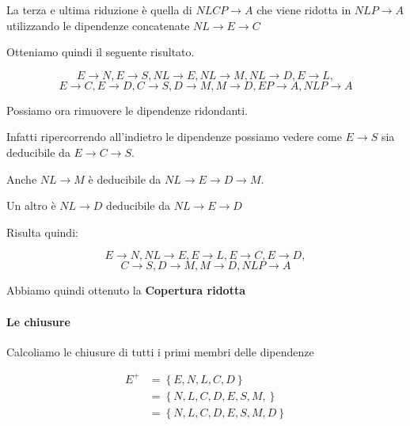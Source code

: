 \begin{exmp}
    La terza e ultima riduzione è quella di $ NLCP \rightarrow A$ che viene ridotta in $NLP \rightarrow A $ utilizzando le dipendenze concatenate $NL \rightarrow E \rightarrow C$ 

    Otteniamo quindi il seguente risultato.

    \[
    E \rightarrow N,
    E \rightarrow S,
    NL \rightarrow E,
    NL \rightarrow M,
    NL \rightarrow D,
    E \rightarrow L,
    \]
    \[
    E \rightarrow C,
    E \rightarrow D,
    C \rightarrow S,
    D \rightarrow M,
    M \rightarrow D,
    EP \rightarrow A,
    NLP \rightarrow A
    \]

    Possiamo ora rimuovere le dipendenze ridondanti.

    Infatti ripercorrendo all'indietro le dipendenze possiamo vedere come $E \rightarrow S$ sia deducibile da $E \rightarrow C  \rightarrow S$.

    Anche $NL \rightarrow M$ è deducibile da $ NL \rightarrow E \rightarrow D \rightarrow M$.

    Un altro è $NL \rightarrow D$ deducibile da $NL \rightarrow E \rightarrow D $ 

    Risulta quindi:

    \[
        E \rightarrow N,
        NL \rightarrow E,
        E \rightarrow L,
        E \rightarrow C,
        E \rightarrow D,
        \]
        \[
        C \rightarrow S,
        D \rightarrow M,
        M \rightarrow D,
        NLP \rightarrow A
        \]

    Abbiamo quindi ottenuto la \textbf{Copertura ridotta}

    \paragraph{Le chiusure}

    Calcoliamo le chiusure di tutti i primi membri delle dipendenze

    \begin{equation}
        \begin{split}
            E^+&= \left\{E, N,L,C,D  \right\} \\
            &= \left\{ N,L,C,D,E,S,M, \right\}  \\
            &= \left\{ N,L,C,D,E,S,M,D \right\}  \\
        \end{split}
    \end{equation}


\end{exmp}
